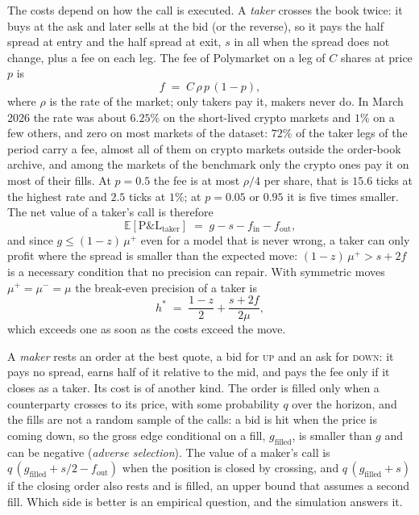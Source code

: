 The costs depend on how the call is executed.  A \emph{taker} crosses the book twice: it
buys at the ask and later sells at the bid (or the reverse), so it pays the half spread at
entry and the half spread at exit, $s$ in all when the spread does not change, plus a fee on
each leg.  The fee of Polymarket on a leg of $C$ shares at price $p$ is
\begin{equation}
  f \;=\; C\,\rho\,p\,(1 - p),
  \label{eq:econ:fee}
\end{equation}
where $\rho$ is the rate of the market; only takers pay it, makers never do.  In March 2026
the rate was about $6.25\%$ on the short-lived crypto markets and $1\%$ on a few others, and
zero on most markets of the dataset: $72\%$ of the taker legs of the period carry a fee,
almost all of them on crypto markets outside the order-book archive, and among the markets
of the benchmark only the crypto ones pay it on most of their fills.  At $p = 0.5$ the fee is
at most $\rho / 4$ per share, that is $15.6$ ticks at the highest rate and $2.5$ ticks at
$1\%$; at $p = 0.05$ or $0.95$ it is five times smaller.  The net value of a taker's call is
therefore
\begin{equation}
  \mathbb{E}[\text{P\&L}_{\text{taker}}] \;=\; g - s - f_{\text{in}} - f_{\text{out}},
  \label{eq:econ:taker}
\end{equation}
and since $g \le (1 - z)\,\mu^{+}$ even for a model that is never wrong, a taker can only
profit where the spread is smaller than the expected move: $(1 - z)\,\mu^{+} > s + 2f$ is a
necessary condition that no precision can repair.  With symmetric moves
$\mu^{+} = \mu^{-} = \mu$ the break-even precision of a taker is
\begin{equation}
  h^{*} \;=\; \frac{1 - z}{2} + \frac{s + 2f}{2\mu},
  \label{eq:econ:breakeven}
\end{equation}
which exceeds one as soon as the costs exceed the move.

A \emph{maker} rests an order at the best quote, a bid for \textsc{up} and an ask for
\textsc{down}: it pays no spread, earns half of it relative to the mid, and pays the fee only
if it closes as a taker.  Its cost is of another kind.  The order is filled only when a
counterparty crosses to its price, with some probability $q$ over the horizon, and the fills
are not a random sample of the calls: a bid is hit when the price is coming down, so the
gross edge conditional on a fill, $g_{\text{filled}}$, is smaller than $g$ and can be
negative (\emph{adverse selection}).  The value of a maker's call is
$q\,(g_{\text{filled}} + s/2 - f_{\text{out}})$ when the position is closed by crossing, and
$q\,(g_{\text{filled}} + s)$ if the closing order also rests and is filled, an upper bound
that assumes a second fill.  Which side is better is an empirical question, and the
simulation answers it.

